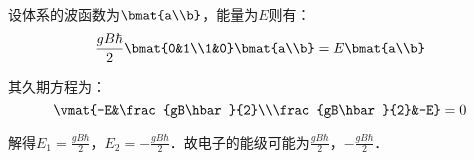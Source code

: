 \begin{enumerate}
设体系的波函数为$\bmat{a\\b}$，能量为$E$则有：
\begin{equation}
\frac{gB\hbar}{2}\bmat{0&1\\1&0}\bmat{a\\b}=E\bmat{a\\b}
\end{equation}

其久期方程为：
\begin{equation}
\vmat{-E&\frac{gB\hbar}{2}\\\frac{gB\hbar}{2}&-E}=0
\end{equation}

解得$E_{1}=\frac{gB\hbar}{2}$，$E_{2}=-\frac{gB\hbar}{2}$．故电子的能级可能为$\frac{gB\hbar}{2}$，$-\frac{gB\hbar}{2}$．
\end{enumerate}
\subsection{ }
